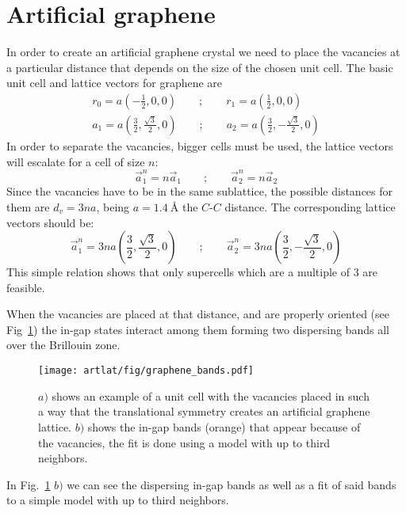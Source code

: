 \section{Artificial graphene}
In order to create an artificial graphene crystal we need to place the vacancies at a particular distance that depends on the size of the chosen unit cell.
The basic unit cell and lattice vectors for graphene are
\begin{equation}
\begin{split}
  r_0 = a\left(-\frac{1}{2},0,0\right) \qquad ; \qquad
  r_1 = a\left(\frac{1}{2},0,0\right)\\
  a_1 = a\left(\frac{3}{2},\frac{\sqrt{3}}{2},0\right) \qquad ; \qquad
  a_2 = a\left(\frac{3}{2},-\frac{\sqrt{3}}{2},0\right)
\end{split}
\end{equation}
In order to separate the vacancies, bigger cells must be used, the lattice vectors will escalate for a cell of size $n$:
\begin{equation}
  \vec{a}^n_1 = n \vec{a}_1 \qquad ; \qquad \vec{a}^n_2 = n \vec{a}_2
\end{equation}
Since the vacancies have to be in the same sublattice, the possible distances for them are $d_v = 3na$, being $a=\SI{1.4}{\angstrom}$ the $C$-$C$ distance. The corresponding lattice vectors should be:
\begin{equation}
  \vec{a}^n_1 = 3na\left(\frac{3}{2},\frac{\sqrt{3}}{2},0\right) \qquad ; \qquad
  \vec{a}^n_2 = 3na\left(\frac{3}{2},-\frac{\sqrt{3}}{2},0\right)
\end{equation}
This simple relation shows that only supercells which are a multiple of 3 are feasible.



When the vacancies are placed at that distance, and are properly oriented (see Fig~\ref{graphene}) the in-gap states interact among them forming two dispersing bands all over the Brillouin zone.
\begin{figure}[h!]
  \centering
  \texttt{[image: artlat/fig/graphene\_bands.pdf]}
  \vspace{-5pt}
  \caption{$a)$ shows an example of a unit cell with the vacancies placed in such a way that the translational symmetry creates an artificial graphene lattice. $b)$ shows the in-gap bands (orange) that appear because of the vacancies, the fit is done using a model with up to third neighbors.}
  \label{graphene}
\end{figure}
\FloatBarrier
In Fig.~\ref{graphene} $b)$ we can see the dispersing in-gap bands as well as a fit of said bands to a simple model with up to third neighbors.


